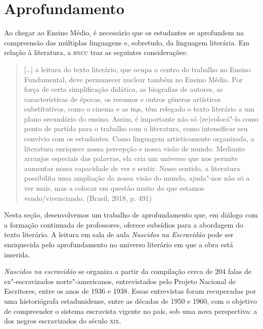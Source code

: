 \documentclass[11pt]{extarticle}
\begin{document}

\section{Aprofundamento}

Ao chegar ao Ensino Médio, é necessário que os estudantes se aprofundem
na compreensão das múltiplas linguagens e, sobretudo, da linguagem
literária. Em relação à literatura, a \textsc{bncc} traz as seguintes
considerações:

\begin{quote}
{[}\ldots{}{]} a leitura do texto literário, que ocupa o centro do trabalho
no Ensino Fundamental, deve permanecer nuclear também no Ensino Médio.
Por força de certa simplificação didática, as biografias de autores, as
características de épocas, os resumos e outros gêneros artísticos
substitutivos, como o cinema e as \textsc{hq}s, têm relegado o texto literário a
um plano secundário do ensino. Assim, é importante não só (re)colocá"-lo
como ponto de partida para o trabalho com a literatura, como
intensificar seu convívio com os estudantes. Como linguagem
artisticamente organizada, a literatura enriquece nossa percepção e
nossa visão de mundo. Mediante arranjos especiais das palavras, ela cria
um universo que nos permite aumentar nossa capacidade de ver e sentir.
Nesse sentido, a literatura possibilita uma ampliação da nossa visão do
mundo, ajuda"-nos não só a ver mais, mas a colocar em questão muito do
que estamos vendo/vivenciando. (Brasil, 2018, p. 491)
\end{quote}

Nesta seção, desenvolvemos um trabalho de aprofundamento que, em diálogo
com a formação continuada de professores, oferece subsídios para a
abordagem do texto literário. A leitura em sala de aula \emph{Nascidos
na Escravidão} pode ser enriquecida pelo aprofundamento no universo
literário em que a obra está inserida.

\emph{Nascidos na escravidão} se organiza a partir da compilação cerca
de 204 falas de ex"-escravizados norte"-americanos, entrevistados pelo
Projeto Nacional de Escritores, entre os anos de 1936 e 1938. Essas
entrevistas foram recuperadas por uma historiógrafa estadunidense, entre
as décadas de 1950 e 1960, com o objetivo de compreender o sistema
escravista vigente no país, sob uma nova perspectiva: a dos negros
escravizados do século \textsc{xix}.
\end{document}
